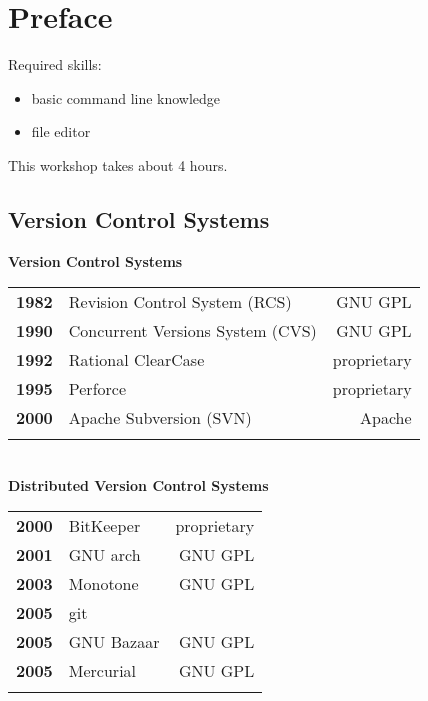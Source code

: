\section{Preface}
\begin{frame}
  \slidetitle

  Required skills:
  \begin{itemize}
    \item basic command line knowledge
    \item file editor
  \end{itemize}
  \vspace{1em}
  This workshop takes about 4 hours.
\end{frame}

\subsection{Version Control Systems}
\begin{frame}
  \subslidetitle

  \textbf{Version Control Systems}
  \pause
  \\
  \begin{tabular}{lp{5cm}r}
    \textbf{1982} & Revision Control System (RCS) & GNU GPL \\
    \pause
    \textbf{1990} & Concurrent Versions System (CVS) & GNU GPL \\
    \pause
    \textbf{1992} & Rational ClearCase & proprietary \\
    \pause
    \textbf{1995} & Perforce  & proprietary \\
    \pause
    \textbf{2000} & Apache Subversion (SVN)  & Apache \\
    \pause
  \end{tabular}
  \\
  \textbf{Distributed Version Control Systems}
  \pause
  \\
  \begin{tabular}{lp{5cm}r}
    \textbf{2000} & BitKeeper  & proprietary \\
    \pause
    \textbf{2001} & GNU arch   & GNU GPL \\
    \pause
    \textbf{2003} & Monotone   & GNU GPL \\
    \pause
    \textbf{2005} & git \\
    \pause
    \textbf{2005} & GNU Bazaar & GNU GPL \\
    \pause
    \textbf{2005} & Mercurial  & GNU GPL \\
    \pause
  \end{tabular}

\end{frame}

